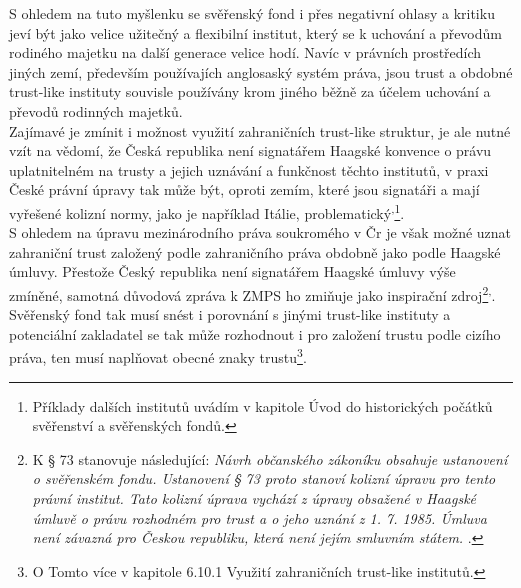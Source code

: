 \documentclass{article}
\begin{document}
S ohledem na tuto myšlenku se svěřenský fond i přes negativní ohlasy a kritiku jeví být jako velice užitečný a flexibilní institut, který se k uchování a převodům rodiného majetku na další generace velice hodí. Navíc v právních prostředích jiných zemí, především používajích anglosaský systém práva, jsou trust a obdobné trust-like instituty souvisle používány krom jiného běžně za účelem uchování a převodů rodinných majetků.\\

Zajímavé je zmínit i možnost využití zahraničních trust-like struktur, je ale nutné vzít na vědomí, že Česká republika není signatářem Haagské konvence o právu uplatnitelném na trusty a jejich uznávání a funkčnost těchto institutů, v praxi České právní úpravy tak může být, oproti zemím, které jsou signatáři a mají vyřešené kolizní normy, jako je například Itálie, problematický\textsuperscript{,}\footnote{Příklady dalších institutů uvádím v kapitole Úvod do historických počátků svěřenství a svěřenských fondů.}.\\

S ohledem na úpravu mezinárodního práva soukromého v Čr je však možné uznat zahraniční trust založený podle zahraničního práva obdobně jako podle Haagské úmluvy. Přestože Český republika není signatářem Haagské úmluvy výše zmíněné, samotná důvodová zpráva k ZMPS ho zmiňuje jako inspirační zdroj\footnote{K § 73 stanovuje následující: \textit{Návrh občanského zákoníku obsahuje ustanovení o svěřenském fondu. Ustanovení § 73 proto stanoví kolizní úpravu pro tento právní institut. Tato kolizní úprava vychází z úpravy obsažené v Haagské úmluvě o právu rozhodném pro trust a o jeho uznání z 1. 7. 1985. Úmluva není závazná pro Českou republiku, která není jejím smluvním státem. }.}\textsuperscript{,}. Svěřenský fond tak musí snést i porovnání s jinými trust-like instituty a potenciální zakladatel se tak může rozhodnout i pro založení trustu podle cizího práva, ten musí naplňovat obecné znaky trustu\footnote{O Tomto více v kapitole 6.10.1 Využití zahraničních trust-like institutů.}.\\

\end{document}
